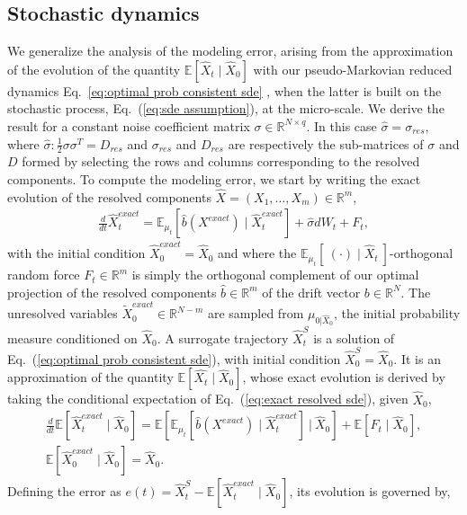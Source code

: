 \documentclass[11pt, a4paper, oneside, reqno]{amsart}
\begin{document}
\subsection{Stochastic dynamics}\label{app:error sde}
\noindent We generalize the analysis of the modeling error, arising from the approximation of the evolution of the quantity $\mathbb{E}[\hat{X}_t\mid \hat{X}_0]$ with our pseudo-Markovian reduced dynamics Eq.~\eqref{eq:optimal prob consistent sde} , when the latter is built on the stochastic process, Eq.~(\ref{eq:sde assumption}), at the micro-scale. We derive the result for a constant noise coefficient matrix $\sigma\in \mathbb{R}^{N\times q}$. In this case $\hat{\sigma}=\sigma_{res}$, where $\hat{\sigma}:\frac{1}{2}\sigma\sigma^T=D_{res}$ and $\sigma_{res}$ and $D_{res}$ are respectively the sub-matrices of $\sigma$ and $D$ formed by selecting the rows and columns corresponding to the resolved components. 
To compute the modeling error, we start by writing the exact evolution of the resolved components $\hat{X}=(X_1,\dots,X_m)\in\mathbb{R}^m$,
\begin{eqnarray}\label{eq:exact resolved sde}
    \frac{d}{dt}\hat{X}^{exact}_t = \mathbb{E}_{\mu_t}[\hat{b}(X^{exact})\mid\hat{X}^{exact}_t] + \hat{\sigma}dW_t  + F_t,
\end{eqnarray}
with the initial condition $\hat{X}^{exact}_0 = \hat{X}_0$ and
where the $\mathbb{E}_{\mu_t}[\:(\cdot)\mid\hat{X}_t\:]$-orthogonal random force $F_t \in \mathbb{R}^m$ is simply the orthogonal complement of our optimal projection of the resolved components $\hat{b}\in\mathbb{R}^m$ of the drift vector $b \in \mathbb{R}^N$. 
The unresolved variables $\tilde{X}_0^{exact} \in\mathbb{R}^{N-m}$ are sampled from $\mu_{0|\hat{X}_0}$, the initial probability measure conditioned on $\hat{X}_0$.  
A surrogate trajectory $\hat{X}^S_t$ is a solution of Eq.~(\ref{eq:optimal prob consistent sde}), with initial condition $\hat{X}^{S}_0 = \hat{X}_0$.
It is an approximation of the quantity $\mathbb{E}[\hat{X_t}\mid\hat{X}_0]$, whose exact evolution is derived by taking the conditional expectation of Eq.~(\ref{eq:exact resolved sde}), given $\hat{X}_0$,
\begin{eqnarray}
    \frac{d}{dt}\mathbb{E}[\hat{X}^{exact}_t\mid\hat{X}_0] = \mathbb{E}\left[\mathbb{E}_{\mu_t}[\hat{b}(X^{exact})\mid\hat{X}^{exact}_t] \:\bigg|\: \hat{X}_0 \right] + \mathbb{E}[F_t\mid\hat{X}_0],\\
    \mathbb{E}[\hat{X}_0^{exact}\mid\hat{X}_0] = \hat{X}_0.
\end{eqnarray}
Defining the error as $e(t)=\hat{X}^S_t-\mathbb{E}[\hat{X}^{exact}_t\mid\hat{X}_0]$, its evolution is governed by,
\end{document}

